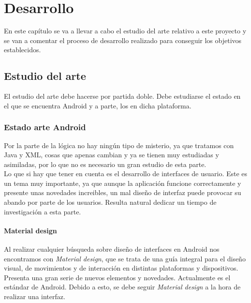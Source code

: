 \chapter{Desarrollo}
\label{cap:desarrollo}

En este capítulo se va a llevar a cabo el estudio del arte relativo a este proyecto y se van a comentar el proceso de desarrollo realizado para conseguir los objetivos establecidos.

\section{Estudio del arte}

El estudio del arte debe hacerse por partida doble. Debe estudiarse el estado en el que se encuentra Android y a parte, los  en dicha plataforma.\\

\subsection{Estado arte Android}

Por la parte de la lógica no hay ningún tipo de misterio, ya que tratamos con Java y XML, cosas que apenas cambian y ya se tienen muy estudiadas y asimiladas, por lo que no es necesario un gran estudio de esta parte.\\

Lo que si hay que tener en cuenta es el desarrollo de interfaces de usuario. Este es un tema muy importante, ya que aunque la aplicación funcione correctamente y presente unas novedades increibles, un mal diseño de interfaz puede provocar su abando por parte de los usuarios. Resulta natural dedicar un tiempo de investigación a esta parte.\\

\subsubsection{Material design}
Al realizar cualquier búsqueda sobre diseño de interfaces en Android nos encontramos con \textit{Material design}, que se trata de una guía integral para el diseño visual, de movimientos y de interacción en distintas plataformas y dispositivos. Presenta una gran serie de nuevos elementos y novedades. Actualmente es el estándar de Android. Debido a esto, se debe seguir \textit{Material design} a la hora de realizar una interfaz.

